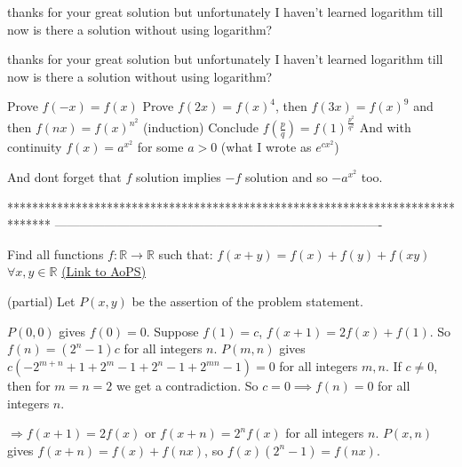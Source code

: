\begin{solution}
	thanks for your great solution but unfortunately I haven't learned logarithm till now is there a solution without using logarithm?
\end{solution}



\begin{solution}
	\begin{tcolorbox}thanks for your great solution but unfortunately I haven't learned logarithm till now is there a solution without using logarithm?\end{tcolorbox}
Prove $f(-x)=f(x)$
Prove $f(2x)=f(x)^4$, then $f(3x)=f(x)^9$ and then $f(nx)=f(x)^{n^2}$ (induction)
Conclude $f(\frac pq)=f(1)^{\frac{p^2}{q^2}}$
And with continuity $f(x)=a^{x^2}$ for some $a>0$ (what I wrote as $e^{cx^2}$)

And dont forget that $f$ solution implies $-f$ solution and so $-a^{x^2}$ too.


\end{solution}
*******************************************************************************
-------------------------------------------------------------------------------

\begin{problem}
	Find all functions $f : \mathbb R \to \mathbb R $ such that:
$f(x+y)=f(x)+f(y)+f(xy) $ $\forall x,y \in \mathbb R $
	\flushright \href{https://artofproblemsolving.com/community/c6h1621929}{(Link to AoPS)}
\end{problem}



\begin{solution}
	(partial)
Let $P(x,y)$ be the assertion of the problem statement.

$P(0,0)$ gives $f(0)=0$. Suppose $f(1)=c$, $f(x+1)=2f(x)+f(1)$. So $f(n)=(2^n-1)c$ for all integers $n$. $P(m,n)$ gives $c(-2^{m+n}+1+2^m-1+2^n-1+2^{mn}-1)=0$ for all integers $m,n$. If $c\neq 0$, then for $m=n=2$ we get a contradiction. So $c=0\implies f(n)=0$ for all integers $n$. 

$\Rightarrow f(x+1)=2f(x)$ or $f(x+n)=2^nf(x)$ for all integers $n$. $P(x,n)$ gives $f(x+n)=f(x)+f(nx)$, so $f(x)(2^n-1)=f(nx)$.
\end{solution}




